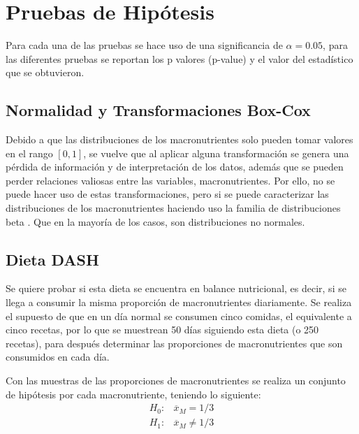 \documentclass[12pt,a4paper]{article}
\begin{document}
    \section{Pruebas de Hipótesis}
    {
        Para cada una de las pruebas se hace uso de una significancia de $\alpha = 0.05$, 
        para las diferentes pruebas se reportan los p valores (p-value) y el valor del 
        estadístico que se obtuvieron.

        \subsection{Normalidad y Transformaciones Box-Cox}
        {
            Debido a que las distribuciones de los macronutrientes solo pueden tomar valores 
            en el rango $[0,1]$, se vuelve que al aplicar alguna transformación se genera una 
            pérdida de información y de interpretación de los datos, además	que se pueden 
            perder relaciones valiosas entre las variables, macronutrientes. Por ello, no se puede 
            hacer uso de estas transformaciones, pero si se puede caracterizar las distribuciones 
            de los macronutrientes haciendo uso la familia de distribuciones beta \cite{beta_distribution}. 
            Que en la mayoría de los casos, son distribuciones no normales.
        }
    
        \subsection{Dieta DASH}
        {
            Se quiere probar si esta dieta se encuentra 
            en balance nutricional, es decir, si se llega a consumir la 
            misma proporción de macronutrientes diariamente. 
            Se realiza el supuesto de que en un día normal se consumen 
            cinco comidas, el equivalente a cinco recetas, por lo que 
            se muestrean 50 días siguiendo esta dieta (o 250 recetas), 
            para después determinar las proporciones 
            de macronutrientes que son consumidos en cada día.\newline

            Con las muestras de las proporciones de macronutrientes se realiza 
            un conjunto de hipótesis por cada macronutriente, teniendo lo 
            siguiente:
            \begin{align*}
                H_0 :& \overline{x}_M = 1/3  \\
                H_1 :& \overline{x}_M \ne 1/3 
            \end{align*}
        
}}
\end{document}
